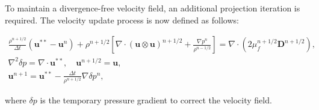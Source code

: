 To maintain a divergence-free velocity field, an additional projection iteration is required. The velocity update process is now defined as follows:

\begin{gather}
\frac{\rho^{n+1/2}}{\Delta t} \left( \mathbf{u}^{**} - \mathbf{u}^n \right)
+ \rho^{n+1/2} \left[ \nabla \cdot (\mathbf{u} \otimes \mathbf{u})^{n+1/2}
+ \frac{\nabla p^n}{\rho^{n-1/2}} \right]
= \nabla \cdot \left( 2 \mu^{n+1/2}_f \mathbf{D}^{n+1/2} \right), \label{eq:velocity_update} \\
\nabla^2 \delta p = \nabla \cdot \mathbf{u}^{**}, \quad \mathbf{u}^{n+1/2} = \mathbf{u}, \label{eq:poisson_delta_p} \\
\mathbf{u}^{n+1} = \mathbf{u}^{**} - \frac{\Delta t}{\rho^{n+1/2}} \nabla \delta p^n, \label{eq update}
\end{gather}

where $\delta p$ is the temporary pressure gradient to correct the velocity field.